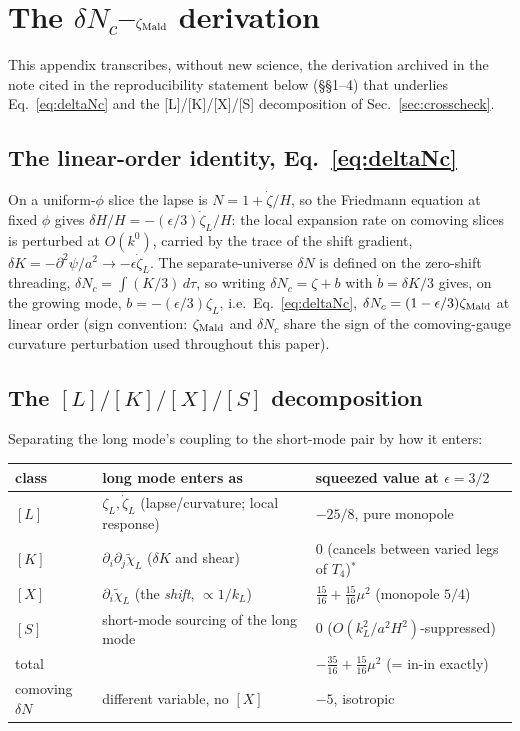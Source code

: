 \documentclass[aps,prd,twocolumn,superscriptaddress,nofootinbib,longbibliography]{revtex4-2}
\begin{document}
\appendix
\section{The $\delta N_c$--$\zeta_{\rm Mald}$ derivation}
\label{app:derivation}

This appendix transcribes, without new science, the derivation archived in
the note cited in the reproducibility statement below
(\S\S1--4) that underlies Eq.~\eqref{eq:deltaNc} and the [L]/[K]/[X]/[S]
decomposition of Sec.~\ref{sec:crosscheck}.

\subsection{The linear-order identity, Eq.~\eqref{eq:deltaNc}}

On a uniform-$\phi$ slice the lapse is $N=1+\dot\zeta/H$, so the Friedmann
equation at fixed $\phi$ gives $\delta H/H=-(\epsilon/3)\dot\zeta_L/H$: the
local expansion rate on comoving slices is perturbed at $O(k^0)$, carried by
the trace of the shift gradient, $\delta K=-\partial^2\psi/a^2\to
-\epsilon\dot\zeta_L$. The separate-universe $\delta N$ is defined on the
zero-shift threading, $\delta N_c=\int(K/3)\,d\tau$, so writing
$\delta N_c=\zeta+b$ with $\dot b=\delta K/3$ gives, on the growing mode,
$b=-(\epsilon/3)\zeta_L$, i.e.\ Eq.~\eqref{eq:deltaNc},
$\delta N_c=(1-\epsilon/3)\zeta_{\rm Mald}$ at linear order (sign convention:
$\zeta_{\rm Mald}$ and $\delta N_c$ share the sign of the comoving-gauge
curvature perturbation used throughout this paper).

\subsection{The $[L]/[K]/[X]/[S]$ decomposition}
\label{app:decomp}

Separating the long mode's coupling to the short-mode pair by how it enters:

\begin{center}
\scriptsize
\begin{tabular}{lp{2.6cm}p{2.1cm}}
\hline\hline
class & long mode enters as & squeezed value at $\epsilon=3/2$ \\
\hline
$[L]$ & $\zeta_L,\dot\zeta_L$ (lapse/curvature; local response) & $-25/8$, pure monopole \\
$[K]$ & $\partial_i\partial_j\tilde\chi_L$ ($\delta K$ and shear) & $0$ (cancels between varied legs of $T_4$)$^{\ast}$ \\
$[X]$ & $\partial_i\tilde\chi_L$ (the \emph{shift}, $\propto1/k_L$) & $\tfrac{15}{16}+\tfrac{15}{16}\mu^2$ (monopole $5/4$) \\
$[S]$ & short-mode sourcing of the long mode & $0$ ($O(k_L^2/a^2H^2)$-suppressed) \\
\hline
total & & $-\tfrac{35}{16}+\tfrac{15}{16}\mu^2$ (= in-in exactly) \\
comoving $\delta N$ & different variable, no $[X]$ & $-5$, isotropic \\
\hline\hline
\end{tabular}
\end{center}
\end{document}
